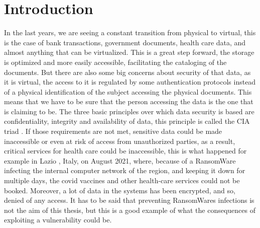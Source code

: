 \chapter{Introduction}
\label{chap:introduction}
In the last years, we are seeing a constant transition from physical to virtual, this is the case of bank transactions, government documents, health care data, and almost anything that can be virtualized. This is a great step forward, the storage is optimized and more easily accessible, facilitating the cataloging of the documents. But there are also some big concerns about security of that data, as it is virtual, the access to it is regulated by some authentication protocols instead of a physical identification of the subject accessing the physical documents. This means that we have to be sure that the person accessing the data is the one that is claiming to be. The three basic principles over which data security is based are confidentiality, integrity and availability of data, this principle is called the CIA triad \cite{cia_triad}.
If those requirements are not met, sensitive data could be made inaccessible or even at risk of access from unauthorized parties, as a result, critical services for health care could be inaccessible, this is what happened for example in Lazio \cite{lazio_hacker_0,lazio_hacker_1}, Italy, on August 2021, where, because of a RansomWare infecting the internal computer network of the region, and keeping it down for multiple days, the covid vaccines and other health-care services could not be booked. Moreover, a lot of data in the systems has been encrypted, and so, denied of any access. It has to be said that preventing RansomWares infections is not the aim of this thesis, but this is a good example of what the consequences of exploiting a vulnerability could be. 

